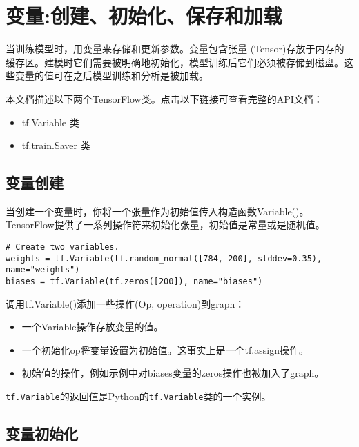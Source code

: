




\section{变量:创建、初始化、保存和加载}\label{variables}

当训练模型时，用变量来存储和更新参数。变量包含张量 (Tensor)存放于内存的缓存区。建模时它们需要被明确地初始化，模型训练后它们必须被存储到磁盘。这些变量的值可在之后模型训练和分析是被加载。

本文档描述以下两个TensorFlow类。点击以下链接可查看完整的API文档：
\begin{itemize}
  \item tf.Variable 类 %
  \item tf.train.Saver 类 %
\end{itemize}

\subsection {变量创建}

当创建一个变量时，你将一个张量作为初始值传入构造函数Variable()。TensorFlow提供了一系列操作符来初始化张量，初始值是常量或是随机值。

\begin{lstlisting}
# Create two variables.
weights = tf.Variable(tf.random_normal([784, 200], stddev=0.35), name="weights")
biases = tf.Variable(tf.zeros([200]), name="biases")
\end{lstlisting}

调用tf.Variable()添加一些操作(Op, operation)到graph：
\begin{itemize}
  \item 一个Variable操作存放变量的值。
  \item 一个初始化op将变量设置为初始值。这事实上是一个tf.assign操作。
  \item 初始值的操作，例如示例中对biases变量的zeros操作也被加入了graph。
\end{itemize}
\lstinline{tf.Variable}的返回值是Python的\lstinline{tf.Variable}类的一个实例。

\subsection {变量初始化}

